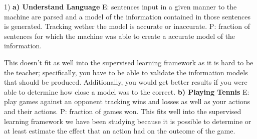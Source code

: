 1) {\bf a) Understand Language} 
E: sentences input in a given manner to the machine are parsed and a model of the information contained in those sentences is generated. Tracking wether the model is accurate or inaccurate.
P: fraction of sentences for which the machine was able to create a accurate model of the information. 

This doesn't fit as well into the supervised learning framework as it is hard to be the teacher; specifically, you have to be able to validate the information models that should be produced.  Additionally, you would get better results if you were able to determine how close a model was to the correct.
{\bf b) Playing Tennis} E: play games against an opponent tracking wins and losses as well as your actions and their actions. P: fraction of games won.
This fits well into the supervised learning framework we have been studying because it is possible to determine or at least estimate the effect that an action had on the outcome of the game. 

